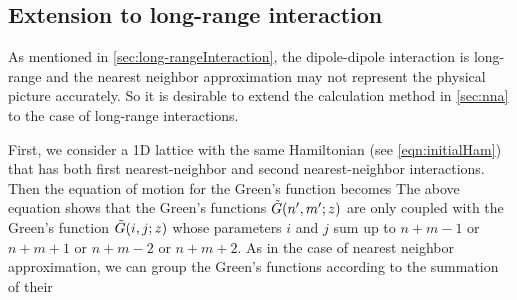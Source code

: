\subsection{Extension to long-range interaction}
\label{sec:long-range}

As mentioned in \autoref{sec:long-rangeInteraction}, the dipole-dipole interaction is long-range and the nearest 
neighbor approximation may not represent the physical picture accurately. So it is desirable to extend the 
calculation method  in \autoref{sec:nna} to the case of long-range interactions. 

First, we consider a 1D lattice with the same Hamiltonian (see \autoref{eqn:initialHam}) that has
both first nearest-neighbor and second nearest-neighbor interactions. 
Then the equation of motion for the Green's
function becomes
The above equation shows that the
Green's functions $\Tilde{G}(n^{\prime}, m^{\prime}; z)$ are only coupled with the Green's function 
$\Tilde{G}(i, j; z)$ whose parameters $i$ and $ j$ sum up to $n+m-1$ or $n+m+1$ or $n+m-2$ or $n+m+2$. As in the
case of nearest neighbor approximation, we can group the Green's functions according to the summation of their 
